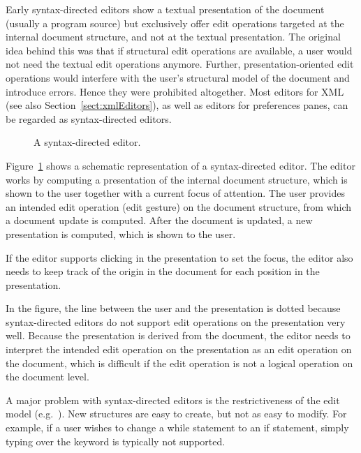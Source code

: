 Early syntax-directed editors show a textual presentation of the document (usually a program source) but exclusively offer edit operations targeted at the internal document structure, and not at the textual presentation. The original idea behind this was that if structural edit operations are available, a user would not need the textual edit operations anymore. Further, presentation-oriented edit operations would interfere with the user's structural model of the document and introduce errors. Hence they were prohibited altogether. Most editors for XML (see also Section~\ref{sect:xmlEditors}), as well as editors for preferences panes, can be regarded as syntax-directed editors.




\begin{figure}
\begin{small}
\begin{center}
\begin{center}
\end{center}\caption{A syntax-directed editor.}\label{synDirEdit} 
\end{center}
\end{small}
\end{figure}


Figure~\ref{synDirEdit} shows a schematic representation of a syntax-directed editor. The editor works by computing a presentation of the internal document structure, which is shown to the user together with a current focus of attention. The user provides an intended edit operation (edit gesture) on the document structure, from which a document update is computed. After the document is updated, a new presentation is computed, which is shown to the user.

If the editor supports clicking in the presentation to set the focus, the editor also needs to keep track of the origin in the document for each position in the presentation.

In the figure, the line between the user and the presentation is dotted because syntax-directed editors do not support edit operations on the presentation very well. Because the presentation is derived from the document, the editor needs to interpret the intended edit operation on the presentation as an edit operation on the document, which is difficult if the edit operation is not a logical operation on the document level.

A major problem with syntax-directed editors is the restrictiveness of the edit model (e.g.~\cite{vanter94practical,rubinNeal87design}). New structures are easy to create, but not as easy to modify. For example, if a user wishes to change a while statement to an if statement, simply typing over the keyword is typically not supported. 
\finallongpage

